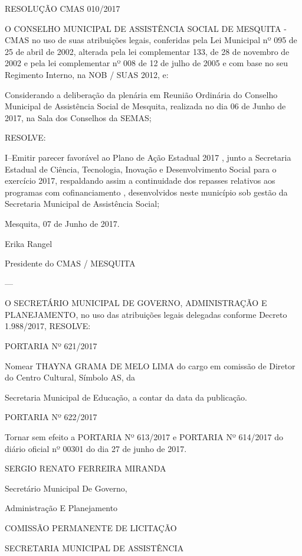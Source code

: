 \documentclass{doliberto}
\begin{document}
RESOLUÇÃO CMAS 010/2017  

 
O  CONSELHO  MUNICIPAL  DE  ASSISTÊNCIA  SOCIAL  DE 
MESQUITA  -  CMAS  no  uso  de  suas  atribuições  legais, 
conferidas pela Lei Municipal nº 095 de 25 de abril de 2002, 
alterada pela lei complementar 133, de 28 de novembro de 
2002 e pela lei complementar nº 008 de 12 de julho de 2005 
e com base no seu Regimento Interno, na NOB / SUAS 2012, 
e:  
 
Considerando  a  deliberação  da  plenária  em  Reunião 
Ordinária  do  Conselho  Municipal  de  Assistência  Social  de 
Mesquita, realizada no dia 06 de Junho de 2017, na Sala dos 
Conselhos da SEMAS; 
 
RESOLVE: 
 
I–Emitir parecer favorável ao Plano de Ação Estadual 2017 , 
junto a Secretaria Estadual de Ciência, Tecnologia, Inovação 
e  Desenvolvimento  Social  para  o  exercício  2017, 
respaldando assim a continuidade dos repasses relativos aos 
programas  com  cofinanciamento 
,  desenvolvidos  neste 
município sob  gestão da Secretaria Municipal de Assistência 
Social;  
 

Mesquita, 07 de Junho de 2017.  

Erika Rangel 

Presidente do CMAS / MESQUITA 

---

O  SECRETÁRIO  MUNICIPAL  DE  GOVERNO, 
ADMINISTRAÇÃO E PLANEJAMENTO, no uso das 
atribuições  legais  delegadas  conforme  Decreto 
1.988/2017, RESOLVE: 
 
PORTARIA Nº 621/2017 
 
Nomear  THAYNA  GRAMA  DE  MELO  LIMA  do  cargo  em 
comissão  de  Diretor  do  Centro  Cultural,  Símbolo  AS,  da 


Secretaria  Municipal  de  Educação,  a  contar  da  data  da 
publicação. 
 
PORTARIA Nº 622/2017 
 
Tornar sem efeito a PORTARIA Nº 613/2017 e PORTARIA 
Nº 614/2017 do diário oficial nº 00301 do dia 27 de junho 
de 2017. 
 

SERGIO RENATO FERREIRA MIRANDA 

Secretário Municipal De Governo, 

Administração E Planejamento 

 

COMISSÃO PERMANENTE DE LICITAÇÃO 

SECRETARIA MUNICIPAL DE ASSISTÊNCIA 
\end{document}
